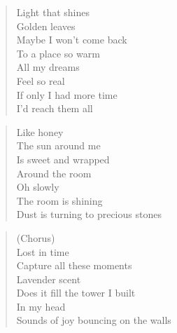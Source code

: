 \phantom{;}
\clearpage




\begin{minipage}{0.5\textwidth}
    \begin{verse}
    Light that shines \\
	Golden leaves \\
	Maybe I won't come back \\
	To a place so warm \\
	All my dreams \\
	Feel so real \\
	If only I had more time \\
	I'd reach them all
    \end{verse}
    
    \begin{verse}
    Like honey \\
	The sun around me \\
	Is sweet and wrapped \\
	Around the room \\
	Oh slowly \\
	The room is shining \\
	Dust is turning to precious stones
    \end{verse}

    \begin{verse}
    (Chorus) \\
	Lost in time \\
	Capture all these moments \\
	Lavender scent \\
	Does it fill the tower I built \\
	In my head \\
	Sounds of joy bouncing on the walls
    \end{verse}

\end{minipage}
